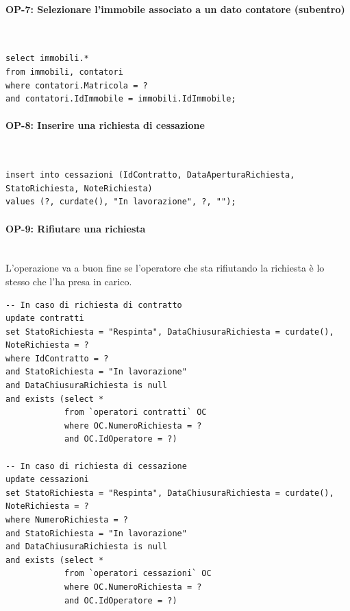 \documentclass[a4paper,12pt]{report}
\begin{document}
\paragraph{OP-7: Selezionare l'immobile associato a un dato contatore (subentro)}\mbox{}\\
\begin{lstlisting}
select immobili.*
from immobili, contatori
where contatori.Matricola = ?
and contatori.IdImmobile = immobili.IdImmobile;
\end{lstlisting}

\paragraph{OP-8: Inserire una richiesta di cessazione}\mbox{}\\
\begin{lstlisting}
insert into cessazioni (IdContratto, DataAperturaRichiesta, StatoRichiesta, NoteRichiesta)
values (?, curdate(), "In lavorazione", ?, "");
\end{lstlisting}

\paragraph{OP-9: Rifiutare una richiesta}\mbox{}\\
L'operazione va a buon fine se l'operatore che sta rifiutando la richiesta è lo stesso che l'ha presa in carico.
\begin{lstlisting}
-- In caso di richiesta di contratto
update contratti
set StatoRichiesta = "Respinta", DataChiusuraRichiesta = curdate(), NoteRichiesta = ?
where IdContratto = ?
and StatoRichiesta = "In lavorazione"
and DataChiusuraRichiesta is null
and exists (select *
            from `operatori contratti` OC
            where OC.NumeroRichiesta = ?
            and OC.IdOperatore = ?)

-- In caso di richiesta di cessazione
update cessazioni
set StatoRichiesta = "Respinta", DataChiusuraRichiesta = curdate(), NoteRichiesta = ?
where NumeroRichiesta = ?
and StatoRichiesta = "In lavorazione"
and DataChiusuraRichiesta is null
and exists (select *
            from `operatori cessazioni` OC
            where OC.NumeroRichiesta = ?
            and OC.IdOperatore = ?)
\end{lstlisting}
\end{document}
